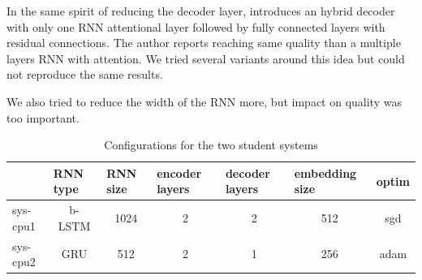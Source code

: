 \documentclass[11pt,a4paper]{article}
\begin{document}
In the same spirit of reducing the decoder layer,  introduces an hybrid decoder with only one RNN attentional layer followed by fully connected layers with residual connections. The author reports reaching same quality than a multiple layers RNN with attention. We tried several variants around this idea but could not reproduce the same results.

We also tried to reduce the width of the RNN more, but impact on quality was too important.

\begin{table}[]
\centering
\begin{tabular}{lcccccc}
\hline
     & \multicolumn{1}{l}{RNN type} & \multicolumn{1}{l}{RNN size} & \multicolumn{1}{l}{encoder layers} & \multicolumn{1}{l}{decoder layers} & \multicolumn{1}{l}{embedding size} & \multicolumn{1}{l}{optim} \\ \hline
sys-cpu1 & b-LSTM                         & 1024                         & 2                                  & 2                                  & 512                                & sgd                       \\ \hline
sys-cpu2 & GRU                          & 512                          & 2                                  & 1                                  & 256                                & adam                      \\ \hline
\end{tabular}
\caption{Configurations for the two student systems}
\label{table:config}
\end{table}
\end{document}
